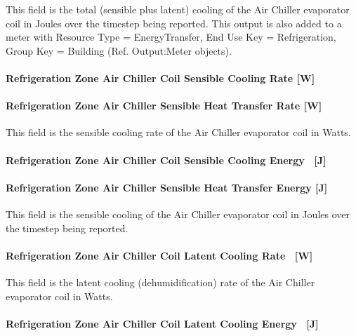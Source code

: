 This field is the total (sensible plus latent) cooling of the Air Chiller evaporator coil in Joules over the timestep being reported. This output is also added to a meter with Resource Type = EnergyTransfer, End Use Key = Refrigeration, Group Key = Building (Ref. Output:Meter objects).

\paragraph{Refrigeration Zone Air Chiller Coil Sensible Cooling Rate {[}W{]}}\label{refrigeration-zone-air-chiller-coil-sensible-cooling-rate-w-1}

\paragraph{Refrigeration Zone Air Chiller Sensible Heat Transfer Rate {[}W{]}}\label{refrigeration-zone-air-chiller-sensible-heat-transfer-rate-w-1}

This field is the sensible cooling rate of the Air Chiller evaporator coil in Watts.

\paragraph{Refrigeration Zone Air Chiller Coil Sensible Cooling Energy ~{[}J{]}}\label{refrigeration-zone-air-chiller-coil-sensible-cooling-energy-j}

\paragraph{Refrigeration Zone Air Chiller Sensible Heat Transfer Energy {[}J{]}}\label{refrigeration-zone-air-chiller-sensible-heat-transfer-energy-j-1}

This field is the sensible cooling of the Air Chiller evaporator coil in Joules over the timestep being reported.

\paragraph{Refrigeration Zone Air Chiller Coil Latent Cooling Rate ~{[}W{]}}\label{refrigeration-zone-air-chiller-coil-latent-cooling-rate-w-1}

This field is the latent cooling (dehumidification) rate of the Air Chiller evaporator coil in Watts.

\paragraph{Refrigeration Zone Air Chiller Coil Latent Cooling Energy ~{[}J{]}}\label{refrigeration-zone-air-chiller-coil-latent-cooling-energy-j}

